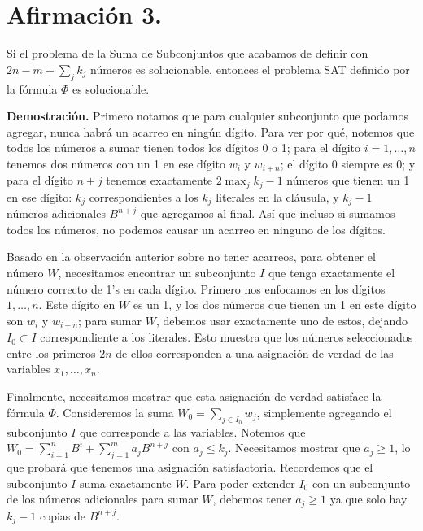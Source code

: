 \documentclass{article}
\begin{document}
\section{Afirmación 3.} Si el problema de la Suma de Subconjuntos que acabamos de definir con \( 2n - m + \sum_{j} k_j \) números es solucionable, entonces el problema SAT definido por la fórmula \( \Phi \) es solucionable.

\textbf{Demostración.} Primero notamos que para cualquier subconjunto que podamos agregar, nunca habrá un acarreo en ningún dígito. Para ver por qué, notemos que todos los números a sumar tienen todos los dígitos 0 o 1; para el dígito \( i = 1, \ldots, n \) tenemos dos números con un 1 en ese dígito \( w_i \) y \( w_{i+n} \); el dígito 0 siempre es 0; y para el dígito \( n + j \) tenemos exactamente \( 2 \max_j k_j - 1 \) números que tienen un 1 en ese dígito: \( k_j \) correspondientes a los \( k_j \) literales en la cláusula, y \( k_j - 1 \) números adicionales \( B^{n+j} \) que agregamos al final. Así que incluso si sumamos todos los números, no podemos causar un acarreo en ninguno de los dígitos.

Basado en la observación anterior sobre no tener acarreos, para obtener el número \( W \), necesitamos encontrar un subconjunto \( I \) que tenga exactamente el número correcto de 1’s en cada dígito. Primero nos enfocamos en los dígitos \( 1, \ldots, n \). Este dígito en \( W \) es un 1, y los dos números que tienen un 1 en este dígito son \( w_i \) y \( w_{i+n} \); para sumar \( W \), debemos usar exactamente uno de estos, dejando \( I_0 \subset I \) correspondiente a los literales. Esto muestra que los números seleccionados entre los primeros \( 2n \) de ellos corresponden a una asignación de verdad de las variables \( x_1, \ldots, x_n \).

Finalmente, necesitamos mostrar que esta asignación de verdad satisface la fórmula \( \Phi \). Consideremos la suma \( W_0 = \sum_{j \in I_0} w_j \), simplemente agregando el subconjunto \( I \) que corresponde a las variables. Notemos que \( W_0 = \sum_{i=1}^{n} B^i + \sum_{j=1}^{m} a_j B^{n+j} \) con \( a_j \leq k_j \). Necesitamos mostrar que \( a_j \geq 1 \), lo que probará que tenemos una asignación satisfactoria. Recordemos que el subconjunto \( I \) suma exactamente \( W \). Para poder extender \( I_0 \) con un subconjunto de los números adicionales para sumar \( W \), debemos tener \( a_j \geq 1 \) ya que solo hay \( k_j - 1 \) copias de \( B^{n+j} \).
\end{document}
